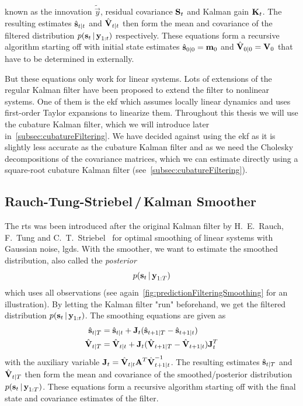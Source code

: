 		known as the innovation \(\tilde{\vec{y}}\), residual covariance \(\boldsymbol{\mathrm{S}}_t\) and Kalman gain \(\boldsymbol{\mathrm{K}}_t\). The resulting estimates \( \hat{\boldsymbol{\mathrm{s}}}_{t \vert t} \) and \( \hat{\boldsymbol{\mathrm{V}}}_{t \vert t} \) then form the mean and covariance of the filtered distribution \( p(\boldsymbol{\mathrm{s}}_t \,\vert\, \boldsymbol{\mathrm{y}}_{1:t}) \) respectively. These equations form a recursive algorithm starting off with initial state estimates \( \hat{\boldsymbol{\mathrm{s}}}_{0 \vert 0} = \boldsymbol{\mathrm{m}}_0 \) and \( \hat{\boldsymbol{\mathrm{V}}}_{0 \vert 0} = \boldsymbol{\mathrm{V}}_0 \) that have to be determined in externally.

		But these equations only work for linear systems. Lots of extensions of the regular Kalman filter have been proposed to extend the filter to nonlinear systems. One of them is the \ac{ekf} which assumes locally linear dynamics and uses first-order Taylor expansions to linearize them. Throughout this thesis we will use the cubature Kalman filter, which we will introduce later in~\autoref{subsec:cubatureFiltering}. We have decided against using the \ac{ekf} as it is slightly less accurate as the cubature Kalman filter and as we need the Cholesky decompositions of the covariance matrices, which we can estimate directly using a square-root cubature Kalman filter (see~\autoref{subsec:cubatureFiltering}).

	\subsection{Rauch-Tung-Striebel\,/\,Kalman Smoother}
		The \ac{rts} was been introduced after the original Kalman filter by H.~E.~Rauch, F.~Tung and C.~T.~Striebel~\cite{rauchMaximumLikelihoodEstimates1965} for optimal smoothing of linear systems with Gaussian noise, \ie \ac{lgds}. With the smoother, we want to estimate the smoothed distribution, also called the \emph{posterior}
		\begin{equation*}
			p(\boldsymbol{\mathrm{s}}_t \,\vert\, \boldsymbol{\mathrm{y}}_{1:T})
		\end{equation*}
		which uses all observations (see again~\autoref{fig:predictionFilteringSmoothing} for an illustration). By letting the Kalman filter "run" beforehand, we get the filtered distribution \( p(\boldsymbol{\mathrm{s}}_t \,\vert\, \boldsymbol{\mathrm{y}}_{1:t}) \). The smoothing equations are given as
		\begin{align}
			\hat{\boldsymbol{\mathrm{s}}}_{t \vert T} &= \hat{\boldsymbol{\mathrm{s}}}_{t \vert t} + \boldsymbol{\mathrm{J}}_t (\hat{\boldsymbol{\mathrm{s}}}_{t + 1 \vert T} - \hat{\boldsymbol{\mathrm{s}}}_{t + 1 \vert t})  \label{eqn:rtsState} \\
			\hat{\boldsymbol{\mathrm{V}}}_{t \vert T} &= \hat{\boldsymbol{\mathrm{V}}}_{t \vert t} + \boldsymbol{\mathrm{J}}_t (\hat{\boldsymbol{\mathrm{V}}}_{t + 1 \vert T} - \hat{\boldsymbol{\mathrm{V}}}_{t + 1 \vert t}) \boldsymbol{\mathrm{J}}_t^T  \label{eqn:rtsCov}
		\end{align}
		with the auxiliary variable \( \boldsymbol{\mathrm{J}}_t = \hat{\boldsymbol{\mathrm{V}}}_{t \vert t} \boldsymbol{\mathrm{A}}^T \hat{\boldsymbol{\mathrm{V}}}_{t + 1 \vert t}^{-1} \). The resulting estimates \( \hat{\boldsymbol{\mathrm{s}}}_{t \vert T} \) and \( \hat{\boldsymbol{\mathrm{V}}}_{t \vert T} \) then form the mean and covariance of the smoothed/posterior distribution \( p(\boldsymbol{\mathrm{s}}_t \,\vert\, \boldsymbol{\mathrm{y}}_{1:T}) \). These equations form a recursive algorithm starting off with the final state and covariance estimates of the filter.

